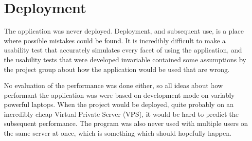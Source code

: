 \section{Deployment}
The application was never deployed.
Deployment, and subsequent use, is a place where possible mistakes could be found.
It is incredibly difficult to make a usability test that accurately simulates every facet of using the application, and the usability tests that were developed invariable contained some assumptions by the project group about how the application would be used that are wrong.

No evaluation of the performance was done either, so all ideas about how performant the application was were based on development mode on variably powerful laptops.
When the project would be deployed, quite probably on an incredibly cheap Virtual Private Server (VPS), it would be hard to predict the subsequent performance.
The program was also never used with multiple users on the same server at once, which is something which should hopefully happen.
